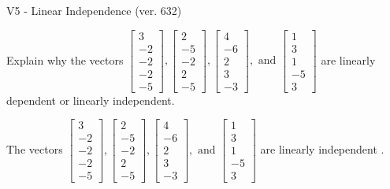 \begin{exercise}
  \begin{exerciseTitle}V5 - Linear Independence (ver. 632)\end{exerciseTitle}
  \begin{exerciseStatement}
    Explain why the vectors \(\left[\begin{array}{r}
3 \\
-2 \\
-2 \\
-2 \\
-5
\end{array}\right] , \left[\begin{array}{r}
2 \\
-5 \\
-2 \\
2 \\
-5
\end{array}\right] , \left[\begin{array}{r}
4 \\
-6 \\
2 \\
3 \\
-3
\end{array}\right] , \text{ and } \left[\begin{array}{r}
1 \\
3 \\
1 \\
-5 \\
3
\end{array}\right]\) are linearly dependent or linearly independent.	


  \end{exerciseStatement}
  \begin{exerciseAnswer}
   The vectors \(\left[\begin{array}{r}
3 \\
-2 \\
-2 \\
-2 \\
-5
\end{array}\right] , \left[\begin{array}{r}
2 \\
-5 \\
-2 \\
2 \\
-5
\end{array}\right] , \left[\begin{array}{r}
4 \\
-6 \\
2 \\
3 \\
-3
\end{array}\right] , \text{ and } \left[\begin{array}{r}
1 \\
3 \\
1 \\
-5 \\
3
\end{array}\right]\) are 
  	 linearly independent  .
  


  \end{exerciseAnswer}
\end{exercise}